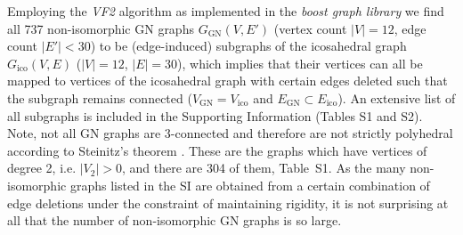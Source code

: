 Employing the \textit{VF2} algorithm \autocite{Cordella_SubGraphIsomorphism_2004}
as implemented in the \textit{boost graph library} \autocite{Siek_BoostGraphLibrary_2002} we find
all 737 non-isomorphic GN graphs $G_\mathrm{GN}(V,E')$ (vertex count $|V|=12$,
edge count $|E'|<30$) to be (edge-induced) subgraphs of the icosahedral graph
$G_\mathrm{ico}(V,E)$ ($|V|=12$, $|E|=30$), which implies that their vertices can
all be mapped to vertices of the icosahedral graph with certain edges deleted
such that the subgraph remains connected ($V_\mathrm{GN} = V_\mathrm{ico}$ and
$E_\mathrm{GN}\subset E_\mathrm{ico}$). An extensive list of all subgraphs is
included in the Supporting Information (Tables S1 and S2). Note, not all GN
graphs are 3-connected and therefore are not strictly polyhedral according to
Steinitz's theorem \autocite{Steinitz_PolyederundRaumeinteilungen_1916}. These are the graphs which have
vertices of degree 2, i.e. $|V_2|>0$, and there are 304 of them, Table~S1. As
the many non-isomorphic graphs listed in the SI are obtained from a certain
combination of edge deletions under the constraint of maintaining rigidity, it
is not surprising at all that the number of non-isomorphic GN graphs is so
large.

